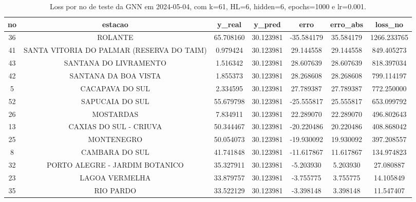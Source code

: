 \begin{table}[h]
\centering
\caption{Loss por no de teste da GNN em 2024-05-04, com k=61, HL=6, hidden=6, epochs=1000 e lr=0.001.}
\label{tab:gnn_loss_k61_hl6_h6_e1000_d20240504}
\begin{tabular}{ccccccc}
\toprule
no & estacao & y\_real & y\_pred & erro & erro\_abs & loss\_no \\
\midrule
36 & ROLANTE & 65.708160 & 30.123981 & -35.584179 & 35.584179 & 1266.233765 \\
41 & SANTA VITORIA DO PALMAR (RESERVA DO TAIM) & 0.979424 & 30.123981 & 29.144558 & 29.144558 & 849.405273 \\
43 & SANTANA DO LIVRAMENTO & 1.516342 & 30.123981 & 28.607639 & 28.607639 & 818.397034 \\
42 & SANTANA DA BOA VISTA & 1.855373 & 30.123981 & 28.268608 & 28.268608 & 799.114197 \\
5 & CACAPAVA DO SUL & 2.334595 & 30.123981 & 27.789387 & 27.789387 & 772.250000 \\
52 & SAPUCAIA DO SUL & 55.679798 & 30.123981 & -25.555817 & 25.555817 & 653.099792 \\
26 & MOSTARDAS & 7.834911 & 30.123981 & 22.289070 & 22.289070 & 496.802643 \\
13 & CAXIAS DO SUL - CRIUVA & 50.344467 & 30.123981 & -20.220486 & 20.220486 & 408.868042 \\
25 & MONTENEGRO & 50.054073 & 30.123981 & -19.930092 & 19.930092 & 397.208557 \\
8 & CAMBARA DO SUL & 41.741848 & 30.123981 & -11.617867 & 11.617867 & 134.974823 \\
32 & PORTO ALEGRE - JARDIM BOTANICO & 35.327911 & 30.123981 & -5.203930 & 5.203930 & 27.080887 \\
23 & LAGOA VERMELHA & 33.879757 & 30.123981 & -3.755775 & 3.755775 & 14.105849 \\
35 & RIO PARDO & 33.522129 & 30.123981 & -3.398148 & 3.398148 & 11.547407 \\
\bottomrule
\end{tabular}
\end{table}
